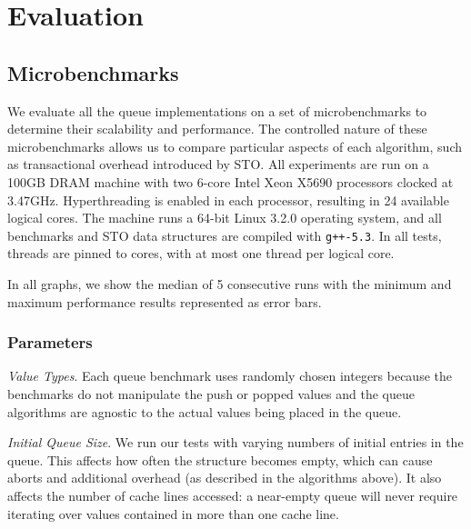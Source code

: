 \section{Evaluation}

\subsection{Microbenchmarks}
\label{q_microbenchmarks}

We evaluate all the queue implementations on a set of microbenchmarks to determine their scalability and performance. The controlled nature of these microbenchmarks allows us to compare particular aspects of each algorithm, such as transactional overhead introduced by STO. All experiments are run on a 100GB DRAM machine with two 6-core Intel Xeon X5690 processors clocked at 3.47GHz. Hyperthreading is enabled in each processor, resulting in 24 available logical cores. The machine runs a 64-bit Linux 3.2.0 operating system, and all benchmarks and STO data structures are compiled with \texttt{g++-5.3}. In all tests, threads are pinned to cores, with at most one thread per logical core.

In all graphs, we show the median of 5 consecutive runs with the minimum and maximum performance results represented as error bars.

\subsubsection{Parameters}

\emph{Value Types}. Each queue benchmark uses randomly chosen integers because the benchmarks do not manipulate the push or popped values and the queue algorithms are agnostic to the actual values being placed in the queue.

\emph{Initial Queue Size}. We run our tests with varying numbers of initial entries in the queue. This affects how often the structure becomes empty, which can cause aborts and additional overhead (as described in the algorithms above). It also affects the number of cache lines accessed: a near-empty queue will never require iterating over values contained in more than one cache line.

